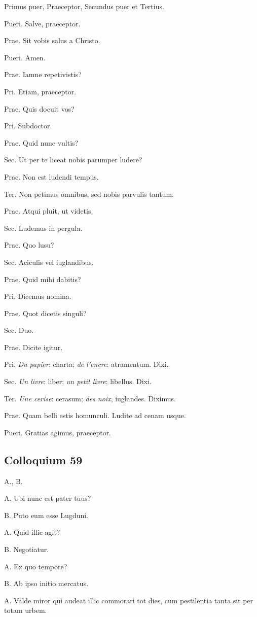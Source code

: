 \documentclass{article}
\newcommand{\fr}[1]{\foreignlanguage{french}{\emph{#1}}}
\begin{document}
Primus puer, Praeceptor, Secundus puer et Tertius.

Pueri. Salve, praeceptor.

Prae. Sit vobis salus a Christo.

Pueri. Amen.

Prae. Iamne repetivistis?

Pri. Etiam, praeceptor.

Prae. Quis docuit vos?

Pri. Subdoctor.

Prae. Quid nunc vultis?

Sec. Ut per te liceat nobis parumper ludere?

Prae. Non est ludendi tempus.

Ter. Non petimus omnibus, sed nobis parvulis tantum.

Prae. Atqui pluit, ut videtis.

Sec. Ludemus in pergula.

Prae. Quo lusu?

Sec. Aciculis vel iuglandibus.

Prae. Quid mihi dabitis?

Pri. Dicemus nomina.

Prae. Quot dicetis singuli?

Sec. Duo.

Prae. Dicite igitur.

Pri. \fr{Du papier}: charta; \fr{de l'encre}: atramentum. Dixi.

Sec. \fr{Un livre}: liber; \fr{un petit livre}: libellus. Dixi.

Ter. \fr{Une cerise}: cerasum; \fr{des noix}, iuglandes. Diximus.

Prae. Quam belli estis homunculi. Ludite ad cenam usque.

Pueri. Gratias agimus, praeceptor.

\subsection{Colloquium 59}
A., B.

A. Ubi nunc est pater tuus?

B. Puto eum esse Lugduni.

A. Quid illic agit?

B. Negotiatur.

A. Ex quo tempore?

B. Ab ipso initio mercatus.

A. Valde miror qui audeat illic commorari tot dies, cum pestilentia tanta sit per totam urbem.
\end{document}
